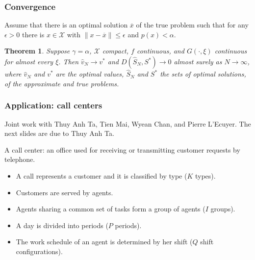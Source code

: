 \documentclass[aspectratio=169]{beamer}
\newtheorem{theo}{Theorem}
\begin{document}
\begin{frame}
	\frametitle{Convergence}
	
	Assume that  there is an optimal solution $\overline{x}$ of the true problem such that for any $\epsilon > 0$ there is $x \in \mathcal{X}$ with $\| x - \overline{x} \| \leq \epsilon$ and $p(x) < \alpha$.
	
	\mbox{}
	
	\begin{theo}
		Suppose $\gamma = \alpha$, $\mathcal{X}$ compact, $f$ continuous, and $G(\cdot,\xi)$ continuous for almost every $\xi$.
		Then $\hat{v}_N \rightarrow v^*$ and $D(\hat{S}_N,S^*) \rightarrow 0$ almost surely as $N \rightarrow \infty$, where $\hat{v}_N$ and $v^*$ are the optimal values, $\hat{S}_N$ and $S^*$ the sets of optimal solutions, of the approximate and true problems.
	\end{theo}
	
\end{frame}

\begin{frame}
	\frametitle{Application: call centers}
	
	Joint work with Thuy Anh Ta, Tien Mai, Wyean Chan, and Pierre L'Ecuyer.
	The next slides are due to Thuy Anh Ta.
	
	\mbox{}
	
	{\color{red}A call center}: an  office used for receiving or transmitting customer requests by {\color{red}telephone}.
	
	
	\begin{itemize}
		\item A {\color{blue}call} represents a customer and it is classified by {\color{blue}type} ($K$ types). 
		\item Customers are served by {\color{blue}agents}.
		\item Agents sharing a common set of tasks form a {\color{blue}group} of agents ($I$ groups).
		\item A day is divided into {\color{blue}periods} ($P$ periods).
		\item The work schedule of an agent is determined by her {\color{blue}shift} ($Q$ shift configurations).
	\end{itemize}
	
\end{frame}
\end{document}
